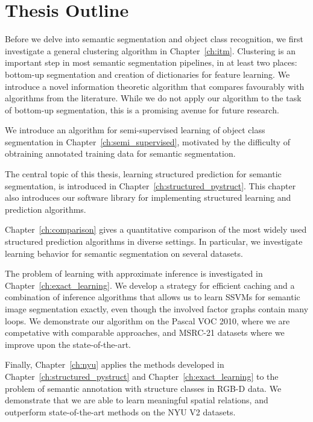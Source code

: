 \section{Thesis Outline}
Before we delve into semantic segmentation and object class recognition, we
first investigate a general clustering algorithm in Chapter~\ref{ch:itm}.
Clustering is an important step in most semantic segmentation pipelines, in at
least two places: bottom-up segmentation and creation of dictionaries for
feature learning. We introduce a novel information theoretic algorithm that
compares favourably with algorithms from the literature.  While we do not apply
our algorithm to the task of bottom-up segmentation, this is a promising avenue
for future research.

We introduce an algorithm for semi-supervised learning of object class
segmentation in Chapter~\ref{ch:semi_supervised}, motivated by the difficulty of
obtraining annotated training data for semantic segmentation.

The central topic of this thesis, learning structured prediction for semantic
segmentation, is introduced in Chapter~\ref{ch:structured_pystruct}. This
chapter also introduces our software library for implementing structured
learning and prediction algorithms.

Chapter~\ref{ch:comparison} gives a quantitative comparison of the most widely
used structured prediction algorithms in diverse settings.
In particular, we investigate learning behavior for
semantic segmentation on several datasets.

The problem of learning with approximate inference is investigated in
Chapter~\ref{ch:exact_learning}.  We develop a strategy for efficient caching
and a combination of inference algorithms that allows us to learn SSVMs for
semantic image segmentation exactly, even though the involved factor graphs
contain many loops. We demonstrate our algorithm on the Pascal VOC 2010, where we are competative
with comparable approaches, and MSRC-21 datasets where we improve upon the state-of-the-art.

Finally, Chapter~\ref{ch:nyu} applies the methods developed in
Chapter~\ref{ch:structured_pystruct} and Chapter~\ref{ch:exact_learning} to the
problem of semantic annotation with structure classes in RGB-D data. We
demonstrate that we are able to learn meaningful spatial relations, and outperform
state-of-the-art methods on the NYU V2 datasets.
\pagebreak

